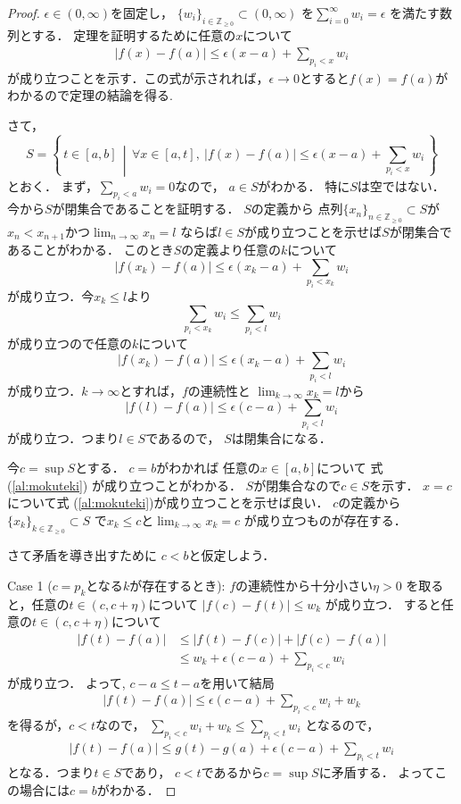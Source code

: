 \documentclass[leqno, a4paper, 12pt]{jsarticle}
\newcommand{\zz}{\mathbb{Z}}
\begin{document}
\begin{proof}
$\epsilon\in (0, \infty)$を固定し，
$\{w_{i}\}_{i\in \zz_{\ge 0}}\subset (0, \infty)$
を$\sum_{i=0}^{\infty}w_{i}=\epsilon$
を満たす数列とする．
定理を証明するために任意の$x$について
\begin{align}\label{al:mokuteki}
|f(x)-f(a)|\le \epsilon(x-a)+\sum_{p_{i}<x}w_{i}
\end{align}
が成り立つことを示す．この式が示されれば，$\epsilon\to 0$とすると$f(x)=f(a)$がわかるので定理の結論を得る.

さて，
\[
S=\left\{\, 
t\in [a, b]
\, \middle |\, 
\forall x\in [a, t], \ 
|f(x)-f(a)|\le \epsilon(x-a)+
\sum_{p_{i}<x}w_{i}
\, \right\}
\]
とおく．
まず，$\sum_{p_{i}<a}w_{i}=0$なので，
$a\in S$がわかる．
特に$S$は空ではない．
今から$S$が閉集合であることを証明する．
$S$の定義から
点列$\{x_{n}\}_{n\in \zz_{\ge 0}}\subset S$が
$x_{n}<x_{n+1}$かつ$\lim_{n\to \infty}x_{n}=l$
ならば$l\in S$が成り立つことを示せば$S$が閉集合であることがわかる．
このとき$S$の定義より任意の$k$について
\[
|f(x_{k})-f(a)|\le\epsilon(x_{k}-a)+
\sum_{p_{i}<x_{k}}w_{i}
\]
が成り立つ．今$x_{k}\le l$より
\[
\sum_{p_{i}<x_{k}}w_{i}\le \sum_{p_{i}<l}w_{i}
\]
が成り立つので任意の$k$について
\[
|f(x_{k})-f(a)|\le \epsilon(x_{k}-a)+
\sum_{p_{i}<l}w_{i}
\]
が成り立つ．$k\to \infty$とすれば，$f$の連続性と
$\lim_{k\to \infty}x_{k}=l$から
\[
|f(l)-f(a)|\le \epsilon(c-a)+
\sum_{p_{i}<l}w_{i}
\]
が成り立つ．つまり$l\in S$であるので，
$S$は閉集合になる．

今$c=\sup S$とする．
$c=b$がわかれば
任意の$x\in [a, b]$について 式 (\ref{al:mokuteki})
が成り立つことがわかる．
$S$が閉集合なので$c\in S$を示す．
$x=c$について式 (\ref{al:mokuteki})が成り立つことを示せば良い．
$c$の定義から$\{x_{k}\}_{k\in \zz_{\ge 0}}\subset S$
で$x_{k}\le c$と$\lim_{k\to \infty}x_{k}=c$
が成り立つものが存在する．


さて矛盾を導き出すために
$c<b$と仮定しよう．

Case 1 ($c=p_{k}$となる$k$が存在するとき):
$f$の連続性から十分小さい$\eta>0$
を取ると，任意の$t\in (c, c+\eta)$について
$|f(c)-f(t)|\le w_{k}$
が成り立つ．
すると任意の$t\in (c, c+\eta)$について
\begin{align*}
|f(t)-f(a)|
&\le 
|f(t)-f(c)|
+|f(c)-f(a)|
\\
&\le w_{k}+\epsilon(c-a)+
\sum_{p_{i}<c}w_{i}
\end{align*}
が成り立つ．
よって, $c-a\le t-a$を用いて結局
\begin{align*}
|f(t)-f(a)|
\le 
\epsilon(c-a)+
\sum_{p_{i}<c}w_{i}+w_{k}
\end{align*}
を得るが，$c<t$なので，
$\sum_{p_{i}<c}w_{i}+w_{k}\le \sum_{p_{i}<t}w_{i}$
となるので，
\begin{align*}
|f(t)-f(a)|
\le 
g(t)-g(a)+\epsilon(c-a)+
\sum_{p_{i}<t}w_{i}
\end{align*}
となる．つまり$t\in S$であり，
$c<t$であるから$c=\sup S$に矛盾する．
よってこの場合には$c=b$がわかる．


\end{proof}
\end{document}
